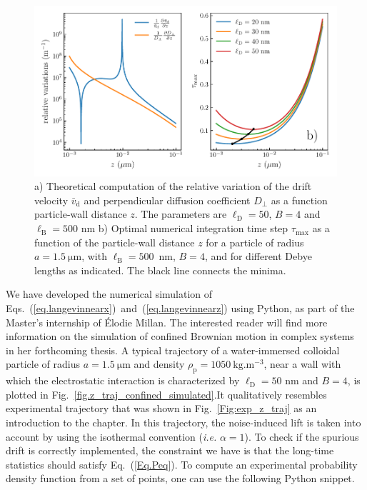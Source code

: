 \begin{figure}[H]
	\centering
	\includegraphics{02_body/chapter3/images/simulation_confined_Brownian_motion/maximal_tau.pdf}
	\caption{a) Theoretical computation of the relative variation of the drift velocity $\bar{v}_\mathrm{d}$ and perpendicular diffusion coefficient $D_\bot$ as a function particle-wall distance $z$. The parameters are $\ell_\mathrm{D}=50$, $B=4$ and $\ell_{\mathrm{B}} = 500$ nm b) Optimal numerical integration time step $\tau_\mathrm{max}$ as a function of the particle-wall distance $z$ for a particle of radius $a = 1.5 ~\mathrm{\mu m}$, with $\ell_{\textrm{B}}=500$~nm, $B = 4$, and for different Debye lengths as indicated. The black line connects the minima.\href{https://github.com/eXpensia/Confined-Brownian-Motion/blob/main/02_body/chapter3/images/simulation_confined_Brownian_motion/maximal_tau.ipynb}{\faGithub}} 
	\label{fig.taumax}
\end{figure}


We have developed the numerical simulation of Eqs.~(\ref{eq.langevinnearx})~and~(\ref{eq.langevinnearz}) using Python, as part of the Master's internship of Élodie Millan. The interested reader will find more information on  the simulation of confined Brownian motion in complex systems in her forthcoming thesis. A typical trajectory of a water-immersed colloidal particle of radius $a= 1.5  ~ \mathrm{\mu m}$ and density $\rho_\mathrm{p} = 1050  ~\mathrm{kg.m^{-3}}$, near a wall with which the electrostatic interaction is characterized by $\ell_\mathrm{D} = 50$ nm and $B=4$, is plotted in Fig.~\ref{fig.z_traj_confined_simulated}.It qualitatively resembles experimental trajectory that was shown in Fig.~\ref{Fig:exp_z_traj} as an introduction to the chapter. In this trajectory, the noise-induced lift is taken into account by using the isothermal convention (\textit{i.e.} $\alpha =1 $). To check if the spurious drift is correctly implemented, the constraint we have is that the long-time statistics should satisfy Eq.~(\ref{Eq.Peq}). To compute an experimental probability density function from a set of points, one can use the following Python snippet.

